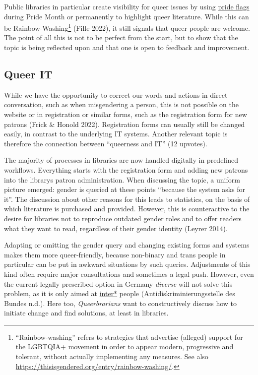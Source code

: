 \documentclass[a4paper,
fontsize=11pt,
oneside,
numbers=noperiodatend,
parskip=half-,
bibliography=totoc,
final
]{scrartcl}
\begin{document}
Public libraries in particular create visibility for queer issues by
using \href{https://www.hrc.org/resources/lgbtq-pride-flags}{pride
flags} during Pride Month or permanently to highlight queer literature.
While this can be Rainbow-Washing\footnote{\enquote{Rainbow-washing} refers to
  strategies that advertise (alleged) support for the LGBTQIA+ movement
  in order to appear modern, progressive and tolerant, without actually
  implementing any measures. See also
  \url{https://thisisgendered.org/entry/rainbow-washing/}.} (Fille
2022), it still signals that queer people are welcome. The point of all
this is not to be perfect from the start, but to show that the topic is
being reflected upon and that one is open to feedback and improvement.

\hypertarget{queer-it}{%
\subsection{Queer IT}\label{queer-it}}

While we have the opportunity to correct our words and actions in direct
conversation, such as when misgendering a person, this is not possible
on the website or in registration or similar forms, such as the
registration form for new patrons (Frick \& Honold 2022). Registration
forms can usually still be changed easily, in contrast to the underlying
IT systems. Another relevant topic is therefore the connection between
\enquote{queerness and IT} (12 upvotes).

The majority of processes in libraries are now handled digitally in
predefined workflows. Everything starts with the registration form and
adding new patrons into the library\textquotesingle s patron
administration. When discussing the topic, a uniform picture emerged:
gender is queried at these points \enquote{because the system asks for it}. The
discussion about other reasons for this leads to statistics, on the
basis of which literature is purchased and provided. However, this is
counteractive to the desire for libraries not to reproduce outdated
gender roles and to offer readers what they want to read, regardless of
their gender identity (Leyrer 2014).

Adapting or omitting the gender query and changing existing forms and
systems makes them more queer-friendly, because non-binary and trans
people in particular can be put in awkward situations by such queries.
Adjustments of this kind often require major consultations and sometimes
a legal push. However, even the current legally prescribed option in
Germany \emph{diverse} will not solve this problem, as it is only aimed
at \href{https://lgbtqia.mywikis.wiki/wiki/Intersex}{inter*} people
(Antidiskriminierungsstelle des Bundes n.d.). Here too,
\emph{Queerbrarians} want to constructively discuss how to initiate
change and find solutions, at least in libraries.
\end{document}
